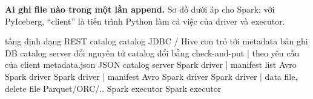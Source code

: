 \textbf{Ai ghi file nào trong một lần append.} Sơ đồ dưới áp cho Spark; với PyIceberg, ``client'' là tiến trình Python làm cả việc của driver và executor.

\begin{codeblock}
tầng                    định dạng      REST catalog                catalog JDBC / Hive
con trỏ tới metadata    bản ghi DB     catalog server đổi nguyên tử catalog đổi bằng check-and-put
        |                              theo yêu cầu của client
metadata.json           JSON           catalog server              Spark driver
        |
manifest list           Avro           Spark driver                Spark driver
        |
manifest                Avro           Spark driver                Spark driver
        |
data file, delete file  Parquet/ORC/.. Spark executor              Spark executor
\end{codeblock}

